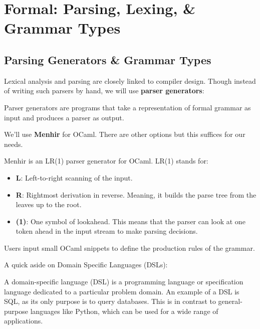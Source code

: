 \section{Formal: Parsing, Lexing, \& Grammar Types}
\subsection{Parsing Generators \& Grammar Types}


Lexical analysis and parsing are closely linked to 
compiler design. Though instead of writing such parsers by 
hand, we will use \textbf{parser generators}:

\begin{Def}

    \label{def:parser-generator}
    Parser generators are programs that take a representation of formal grammar as input and produces a parser as output.
\end{Def}

\noindent
We'll use \textbf{Menhir} for OCaml. There are other options but this suffices for our needs.
\begin{Def}[Menhir]

    Menhir is an LR(1) parser generator for OCaml. LR(1) stands for:
    \begin{itemize}
        \item \textbf{L}: Left-to-right scanning of the input.
        \item \textbf{R}: Rightmost derivation in reverse. Meaning, it builds the parse tree from the leaves up to the root.
        \item \textbf{(1)}: One symbol of lookahead. This means that the parser can look at one token ahead in the input stream to make parsing decisions.
    \end{itemize}
    \noindent
    Users input small OCaml snippets to define the production rules of the grammar.
\end{Def}

\newpage 

\noindent
A quick aside on Domain Specific Languages (DSLs):

\begin{Def}

    A domain-specific language (DSL) is a programming language or specification language dedicated to a particular problem domain.
    An example of a DSL is SQL, as its only purpose is to query databases. This is in contrast to general-purpose languages like Python, which can be used for a wide range of applications.

\end{Def}

